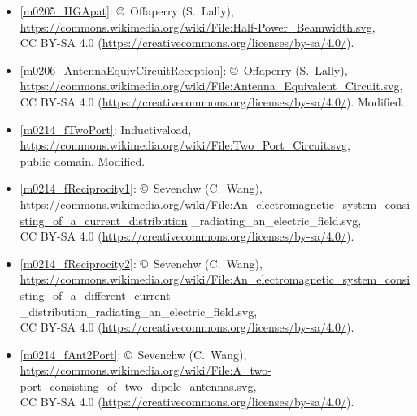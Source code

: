 \begin{itemize}
\item[Fig.] \label{m0205_HGApat_Credit}
  \ref{m0205_HGApat}:
  \copyright~Offaperry (S.\ Lally), 
  \url{https://commons.wikimedia.org/wiki/File:Half-Power_Beamwidth.svg},\\ 
  CC BY-SA 4.0 (\url{https://creativecommons.org/licenses/by-sa/4.0/}).

\item[Fig.] \label{m0206_AntennaEquivCircuitReception_Credit}
  \ref{m0206_AntennaEquivCircuitReception}:
  \copyright~Offaperry (S.\ Lally), 
  \url{https://commons.wikimedia.org/wiki/File:Antenna_Equivalent_Circuit.svg},\\ 
  CC BY-SA 4.0 (\url{https://creativecommons.org/licenses/by-sa/4.0/}).
  Modified.

\item[Fig.] \label{m0214_fTwoPort_Credit}
  \ref{m0214_fTwoPort}:
  Inductiveload, 
  \url{https://commons.wikimedia.org/wiki/File:Two_Port_Circuit.svg},\\ 
  public domain.
  Modified.

\item[Fig.] \label{m0214_fReciprocity1_Credit}
  \ref{m0214_fReciprocity1}:
  \copyright~Sevenchw (C.\ Wang), 
  \href{https://commons.wikimedia.org/wiki/File:An_electromagnetic_system_consisting_of_a_current_distribution_radiating_an_electric_field.svg}{https://commons.wikimedia.org/wiki/File:An\_electromagnetic\_system\_consisting\_of\_a\_current\_distribution} \_radiating\_an\_electric\_field.svg,\\ 
  CC BY-SA 4.0 (\url{https://creativecommons.org/licenses/by-sa/4.0/}).

\item[Fig.] \label{m0214_fReciprocity2_Credit}
  \ref{m0214_fReciprocity2}:
  \copyright~Sevenchw (C.\ Wang), 
  \href{https://commons.wikimedia.org/wiki/File:An_electromagnetic_system_consisting_of_a_different_current_distribution_radiating_an_electric_field.svg}{https://commons.wikimedia.org/wiki/File:An\_electromagnetic\_system\_consisting\_of\_a\_different\_current} \_distribution\_radiating\_an\_electric\_field.svg,\\ 
  CC BY-SA 4.0 (\url{https://creativecommons.org/licenses/by-sa/4.0/}).

\item[Fig.] \label{m0214_fAnt2Port_Credit}
  \ref{m0214_fAnt2Port}:
  \copyright~Sevenchw (C.\ Wang), 
  \url{https://commons.wikimedia.org/wiki/File:A_two-port_consisting_of_two_dipole_antennas.svg},\\ 
  CC BY-SA 4.0 (\url{https://creativecommons.org/licenses/by-sa/4.0/}).


\end{itemize}
